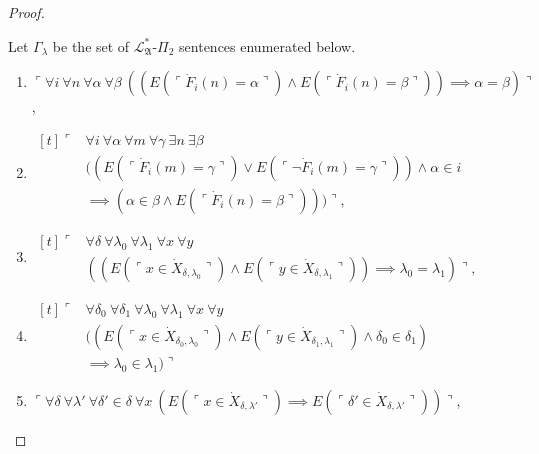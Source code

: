 \documentclass[12pt]{article}
\numberwithin{equation}{section}
\begin{document}
\begin{proof}
\begin{defi}\label{defc}
Let $\Gamma_{\lambda}$ be the set of $\mathcal{L}^*_{\mathfrak{A}}$-$\Pi_2$ sentences enumerated below.  
\begin{enumerate}[label=(S\arabic*)$_{\lambda}$, leftmargin=40pt]
    \item\label{c1} $\ulcorner \forall i \ \forall n \ \forall \alpha \ \forall \beta \ ((E(\ulcorner \dot{F}_i (n) = \alpha \urcorner) \wedge E(\ulcorner \dot{F}_i (n) = \beta \urcorner)) \implies \alpha = \beta) \urcorner$,
    
    \item\label{c2}
    \!
    $\begin{aligned}[t]
        \ulcorner & \forall i \ \forall \alpha \ \forall m \ \forall \gamma \ \exists n \ \exists \beta \\
        & ((E(\ulcorner \dot{F}_i (m) = \gamma \urcorner) \vee E(\ulcorner \neg \dot{F}_i (m) = \gamma \urcorner)) \wedge \alpha \in i \\
        & \implies (\alpha \in \beta \wedge E(\ulcorner \dot{F}_i (n) = \beta \urcorner))) \urcorner, 
    \end{aligned}$

    \item\label{c3} 
    \!
    $\begin{aligned}[t]
        \ulcorner & \forall \delta \ \forall \lambda_0 \ \forall \lambda_1 \ \forall x \ \forall y \\
        & ((E(\ulcorner x \in \dot{X}_{\delta, \lambda_0} \urcorner) \wedge E(\ulcorner y \in \dot{X}_{\delta, \lambda_1} \urcorner)) \implies \lambda_0 = \lambda_1) \urcorner,
    \end{aligned}$

    \item\label{c4}
    \!
    $\begin{aligned}[t]
        \ulcorner & \forall \delta_0 \ \forall \delta_1 \ \forall \lambda_0 \ \forall \lambda_1 \ \forall x \ \forall y \\
        & ((E(\ulcorner x \in \dot{X}_{\delta_0, \lambda_0} \urcorner) \wedge E(\ulcorner y \in \dot{X}_{\delta_1, \lambda_1} \urcorner) \wedge \delta_0 \in \delta_1) \\
        & \implies \lambda_0 \in \lambda_1) \urcorner
    \end{aligned}$

    \item\label{c5} $\ulcorner \forall \delta \ \forall \lambda' \ \forall \delta' \in \delta \ \forall x \ (E(\ulcorner x \in \dot{X}_{\delta, \lambda'} \urcorner) \implies E(\ulcorner \delta' \in \dot{X}_{\delta, \lambda'} \urcorner)) \urcorner$, 
    

\end{enumerate}
\end{defi}
\end{proof}
\end{document}
